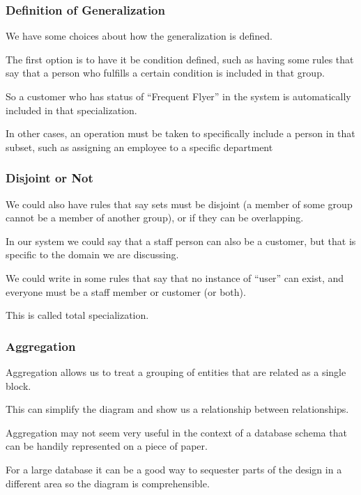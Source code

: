 \begin{frame}
\frametitle{Definition of Generalization}

We have some choices about how the generalization is defined. 

The first option is to have it be \alert{condition} defined, such as having some rules that say that a person who fulfills a certain condition is included in that group. 

So a customer who has status of ``Frequent Flyer'' in the system is automatically included in that specialization. 

In other cases, an operation must be taken to specifically include a person in that subset, such as assigning an employee to a specific department

\end{frame}



\begin{frame}
\frametitle{Disjoint or Not}

We could also have rules that say sets must be disjoint (a member of some group cannot be a member of another group), or if they can be overlapping. 

In our system we could say that a staff person can also be a customer, but that is specific  to the domain we are discussing. 

We could write in some rules that say that no instance of ``user'' can exist, and everyone must be a staff member or customer (or both).

This is called \alert{total specialization}.

\end{frame}




\begin{frame}
\frametitle{Aggregation}
Aggregation allows us to treat a grouping of entities that are related as a single block. 

This can simplify the diagram and show us a relationship between relationships. 

Aggregation may not seem very useful in the context of a database schema that can be handily represented on a piece of paper.

For a large database it can be a good way to sequester parts of the design in a different area so the diagram is comprehensible.

\end{frame}



